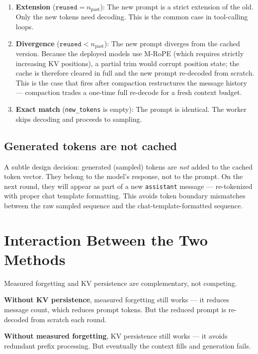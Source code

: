 \documentclass[11pt,a4paper]{article}
\begin{document}
\begin{enumerate}
  \item \textbf{Extension} ($\texttt{reused} = n_{\text{past}}$): The new prompt is a strict extension of the old. Only the new tokens need decoding. This is the common case in tool-calling loops.
  \item \textbf{Divergence} ($\texttt{reused} < n_{\text{past}}$): The new prompt diverges from the cached version. Because the deployed models use M-RoPE (which requires strictly increasing KV positions), a partial trim would corrupt position state; the cache is therefore cleared in full and the new prompt re-decoded from scratch. This is the case that fires after compaction restructures the message history --- compaction trades a one-time full re-decode for a fresh context budget.
  \item \textbf{Exact match} (\texttt{new\_tokens} is empty): The prompt is identical. The worker skips decoding and proceeds to sampling.
\end{enumerate}

\subsection{Generated tokens are not cached}

A subtle design decision: generated (sampled) tokens are \emph{not} added to the cached token vector. They belong to the model's response, not to the prompt. On the next round, they will appear as part of a new \texttt{assistant} message --- re-tokenized with proper chat template formatting. This avoids token boundary mismatches between the raw sampled sequence and the chat-template-formatted sequence.

\section{Interaction Between the Two Methods}

Measured forgetting and KV persistence are complementary, not competing.

\textbf{Without KV persistence}, measured forgetting still works --- it reduces message count, which reduces prompt tokens. But the reduced prompt is re-decoded from scratch each round.

\textbf{Without measured forgetting}, KV persistence still works --- it avoids redundant prefix processing. But eventually the context fills and generation fails.
\end{document}
